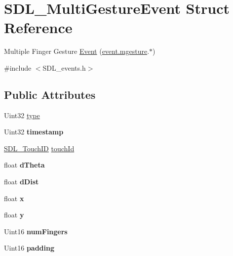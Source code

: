 \hypertarget{structSDL__MultiGestureEvent}{\section{S\+D\+L\+\_\+\+Multi\+Gesture\+Event Struct Reference}
\label{structSDL__MultiGestureEvent}
}


Multiple Finger Gesture \hyperlink{classEvent}{Event} (\hyperlink{unionSDL__Event_ac19b3c6a6b5181a51eb4fbe2cbe726a9}{event.\+mgesture}.$\ast$)  




{\ttfamily \#include $<$S\+D\+L\+\_\+events.\+h$>$}

\subsection*{Public Attributes}
\begin{DoxyCompactItemize}
\item 
Uint32 \hyperlink{structSDL__MultiGestureEvent_ab0c7adc9a3f71cc3532bfe0ff8cc6120}{type}
\item 
\hypertarget{structSDL__MultiGestureEvent_a7e99a98debf3ce11f6d2a2fbb3637175}{Uint32 {\bfseries timestamp}}\label{structSDL__MultiGestureEvent_a7e99a98debf3ce11f6d2a2fbb3637175}

\item 
\hyperlink{structUint64}{S\+D\+L\+\_\+\+Touch\+I\+D} \hyperlink{structSDL__MultiGestureEvent_aa15d1201559a3c9277082af71a972dc1}{touch\+Id}
\item 
\hypertarget{structSDL__MultiGestureEvent_a4f4a920dcf5205baa24a140df56f3153}{float {\bfseries d\+Theta}}\label{structSDL__MultiGestureEvent_a4f4a920dcf5205baa24a140df56f3153}

\item 
\hypertarget{structSDL__MultiGestureEvent_a351c29785c5ce3f68c4591a427265f14}{float {\bfseries d\+Dist}}\label{structSDL__MultiGestureEvent_a351c29785c5ce3f68c4591a427265f14}

\item 
\hypertarget{structSDL__MultiGestureEvent_a1708fc3c788fd12cc0beb5dc05cf31ca}{float {\bfseries x}}\label{structSDL__MultiGestureEvent_a1708fc3c788fd12cc0beb5dc05cf31ca}

\item 
\hypertarget{structSDL__MultiGestureEvent_a264602b9c5cc027eb6a283adda428454}{float {\bfseries y}}\label{structSDL__MultiGestureEvent_a264602b9c5cc027eb6a283adda428454}

\item 
\hypertarget{structSDL__MultiGestureEvent_a6b06cf80372ce3cad40110fdb6ef0353}{Uint16 {\bfseries num\+Fingers}}\label{structSDL__MultiGestureEvent_a6b06cf80372ce3cad40110fdb6ef0353}

\item 
\hypertarget{structSDL__MultiGestureEvent_a4804ec87789e697aba138c4888bb304b}{Uint16 {\bfseries padding}}\label{structSDL__MultiGestureEvent_a4804ec87789e697aba138c4888bb304b}

\end{DoxyCompactItemize}


